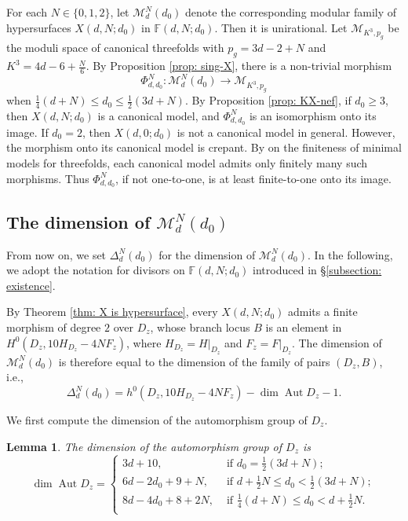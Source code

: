 \documentclass[a4paper,11pt]{amsart}
\newcommand{\M}{\ensuremath{\mathcal{M}}}
\newcommand{\FF}{\ensuremath{\mathbb{F}}}
\DeclareMathOperator{\Aut}{Aut}
\newtheorem{lem}[thm]{Lemma}
\theoremstyle{definition}
\theoremstyle{remark}
\numberwithin{equation}{section}
\begin{document}
For each $N \in \{0, 1, 2\}$, let $\M^N_d(d_0)$ denote the corresponding modular family of hypersurfaces $X(d, N; d_0)$ in $\FF(d, N; d_0)$. Then it is unirational. Let $\M_{K^3, p_g}$ be the moduli space of canonical threefolds with $p_g = 3d - 2 + N$ and $K^3 = 4d - 6 + \frac N6$. By Proposition \ref{prop: sing-X}, there is a non-trivial morphism 
$$
\Phi^N_{d, d_0}: \M^N_d(d_0) \to \M_{K^3, p_g}
$$
when $\frac{1}{4}(d + N) \leq d_0 \leq \frac{1}{2}(3d + N)$. By Proposition \ref{prop: KX-nef}, if $d_0 \ge 3$, then $X(d, N; d_0)$ is a canonical model, and $\Phi^N_{d, d_0}$ is an isomorphism onto its image. If $d_0 = 2$, then $X(d, 0; d_0)$ is not a canonical model in general. However, the morphism onto its canonical model is crepant. By \cite[Main Theorem]{KawamataMatsuki} on the finiteness of minimal models for threefolds, each canonical model admits only finitely many such morphisms. Thus $\Phi^N_{d, d_0}$, if not one-to-one, is at least finite-to-one onto its image.

\subsection{The dimension of $\M^N_d(d_0)$} 

From now on, we set $\Delta^N_d(d_0)$ for the dimension of $\M^N_d(d_0)$. In the following, we adopt the notation for divisors on $\FF(d, N; d_0)$ introduced in \S \ref{subsection: existence}. 

By Theorem \ref{thm: X is hypersurface}, every $X(d, N; d_0)$ admits a finite morphism of degree $2$ over $D_z$, whose branch locus $B$ is an element in $H^0(D_z, 10H_{D_z} - 4NF_z)$, where $H_{D_z} = H|_{D_z}$ and $F_z = F|_{D_z}$. The dimension of $\M^N_d(d_0)$ is therefore equal to the dimension of the family of pairs $(D_z, B)$, i.e.,
\begin{equation} \label{eq: dimension formula}
	\Delta^N_d(d_0) = h^0(D_z, 10H_{D_z} - 4NF_z) - \dim \Aut D_z-1.
\end{equation}

We first compute the dimension of the automorphism group of $D_z$.

\begin{lem} \label{lem: dimension AutDz}
	The dimension of the automorphism group of $D_z$ is
	$$
	\dim\Aut D_z=
	\begin{cases}
		3d + 10, & \text{ if } d_0 = \frac12(3d + N);\\ 
		6d - 2d_0 + 9 + N, & \text{ if } d + \frac12 N \le d_0 < \frac12(3d + N);\\
		8d - 4d_0 + 8 + 2N, & \text{ if } \frac 14(d + N) \le d_0 < d + \frac12 N.\\ 
	\end{cases}
	$$
\end{lem}
\end{document}
